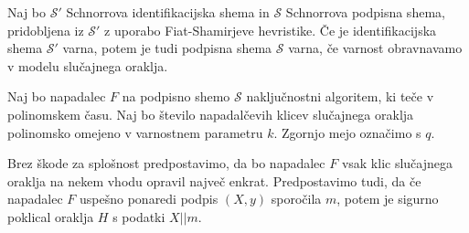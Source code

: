 \documentclass[isrm2, tisk]{fmfdelo}
\begin{document}
\begin{izrek}
    Naj bo $\mathcal{S'}$ Schnorrova identifikacijska shema in $\mathcal{S}$ Schnorrova podpisna
    shema, pridobljena iz $\mathcal{S'}$ z uporabo Fiat-Shamirjeve hevristike. Če je identifikacijska
    shema $\mathcal{S'}$ varna, potem je tudi podpisna shema $\mathcal{S}$ varna, če varnost
    obravnavamo v modelu slučajnega oraklja.
\end{izrek}

\begin{dokaz}
    Naj bo napadalec $F$ na podpisno shemo $\mathcal{S}$ naključnostni algoritem, ki teče v
    polinomskem času. Naj bo število napadalčevih klicev slučajnega oraklja polinomsko omejeno
    v varnostnem parametru $k$. Zgornjo mejo označimo s $q$.

    Brez škode za splošnost predpostavimo, da bo napadalec $F$ vsak klic slučajnega oraklja na
    nekem vhodu opravil največ enkrat. Predpostavimo tudi, da če napadalec $F$ uspešno ponaredi
    podpis $(X, y)$ sporočila $m$, potem je sigurno poklical oraklja $H$ s podatki $X || m$.


\end{dokaz}
\end{document}
